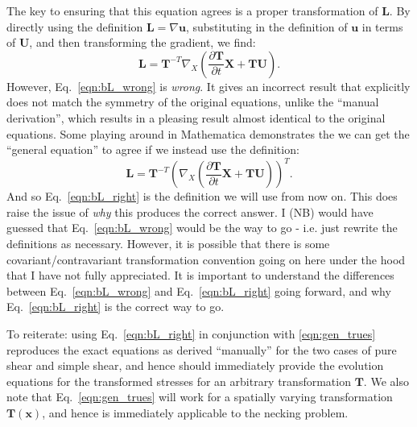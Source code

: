 \documentclass[11pt]{article}
\newcommand{\p}{\partial}
\newcommand{\bL}{\mathbf{L}}
\newcommand{\bT}{\mathbf{T}}
\newcommand{\bU}{\mathbf{U}}
\newcommand{\bX}{\mathbf{X}}
\newcommand{\bx}{\mathbf{x}}
\newcommand{\bu}{\mathbf{u}}
\begin{document}
The key to ensuring that this equation agrees is a proper transformation of $\bL$. By directly using the definition $\bL = \nabla \bu$, substituting in the definition of $\bu$ in terms of $\bU$, and then transforming the gradient, we find:
\begin{equation}
    \bL = \bT^{-T}\nabla_X \left(\frac{\p \bT}{\p t}\bX + \bT\bU\right).
    \label{eqn:bL_wrong}
\end{equation}
However, Eq.~\ref{eqn:bL_wrong} is \emph{wrong}. It gives an incorrect result that explicitly does not match the symmetry of the original equations, unlike the ``manual derivation'', which results in a pleasing result almost identical to the original equations. Some playing around in Mathematica demonstrates the we can get the ``general equation'' to agree if we instead use the definition:
\begin{equation}
    \bL = \bT^{-T}\left(\nabla_X \left(\frac{\p \bT}{\p t}\bX + \bT\bU\right)\right)^T.
    \label{eqn:bL_right}
\end{equation}
And so Eq.~\ref{eqn:bL_right} is the definition we will use from now on. This does raise the issue of \emph{why} this produces the correct answer. I (NB) would have guessed that Eq.~\ref{eqn:bL_wrong} would be the way to go - i.e. just rewrite the definitions as necessary. However, it is possible that there is some covariant/contravariant transformation convention going on here under the hood that I have not fully appreciated. It is important to understand the differences between Eq.~\ref{eqn:bL_wrong} and Eq.~\ref{eqn:bL_right} going forward, and why Eq.~\ref{eqn:bL_right} is the correct way to go. 

To reiterate: using Eq.~\ref{eqn:bL_right} in conjunction with \ref{eqn:gen_trues} reproduces the exact equations as derived ``manually'' for the two cases of pure shear and simple shear, and hence should immediately provide the evolution equations for the transformed stresses for an arbitrary transformation $\bT$. We also note that Eq.~\ref{eqn:gen_trues} will work for a spatially varying transformation $\bT(\bx)$, and hence is immediately applicable to the necking problem.
\end{document}
